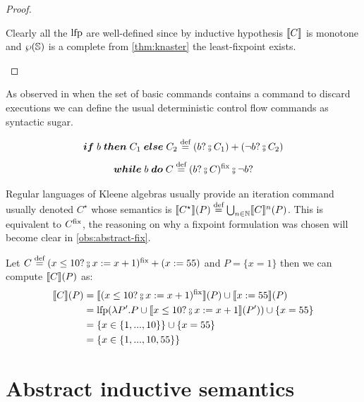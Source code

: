 \documentclass[
  10pt,       %
  twoside,    %
  a4paper,    %
  english,    %
  tikz,       %
  openright,  %
]{book}
\begin{document}
\begin{definition}
\begin{proof}
\begin{itemize}
        Clearly all the $\mathrm{lfp}$ are well-defined since by inductive hypothesis
        $\llbracket C \rrbracket$ is monotone and $\wp(\mathbb{S})$ is a complete from 
        \ref{thm:knaster} the least-fixpoint exists.
    \end{itemize}

  \end{proof}

  \begin{observation}
    As observed in \cite{Fischer79} when the set of basic commands contains a 
    command to discard executions we can define the usual deterministic control 
    flow commands as syntactic sugar.

    $$\bm{if} \; b \; \bm{then} \; C_1 \; \bm{else} \; C_2 \defeq (b ? \fcmp C_1) 
    + (\neg b ? \fcmp C_2)$$
    $$\bm{while} \; b \; \bm{do} \; C \defeq (b? \fcmp C)^\fix \fcmp \neg b ?$$
  \end{observation}

  \begin{observation}
    Regular languages of Kleene algebras \cite{Kozen97} usually provide an
    iteration command usually denoted $C^\star$ whose semantics is
    $\llbracket C^\star \rrbracket(P) \stackrel{\text{def}}{=} \bigcup_{n \in \mathbb{N}} \llbracket C \rrbracket^n(P)$. This is
    equivalent to $C^{\mathrm{fix}}$, the reasoning on why a fixpoint formulation was
    chosen will become clear in \ref{obs:abstract-fix}.
  \end{observation}

  \begin{example}
    Let $C \defeq (x \leq 10? \fcmp x := x + 1)^\fix + (x := 55)$ and 
    $P = \{ x = 1 \}$ then we can compute $\llbracket C \rrbracket(P)$ as:
    \begin{align*}
      \sem{C}(P)
        &= \sem{(x \leq 10? \fcmp x := x +1)^\fix}(P) \cup \sem{x := 55}(P) \\
        &= \lfp(\lambda P' . P \cup \sem{x \leq 10? \fcmp x := x + 1}(P'))
          \cup \{x = 55\} \\
        &= \{ x \in \{1, ..., 10\} \} \cup \{x = 55\} \\
        &= \{ x \in \{1, ..., 10, 55\} \}
    \end{align*}
  \end{example}

\end{definition}

\section{Abstract inductive semantics}
\end{document}
